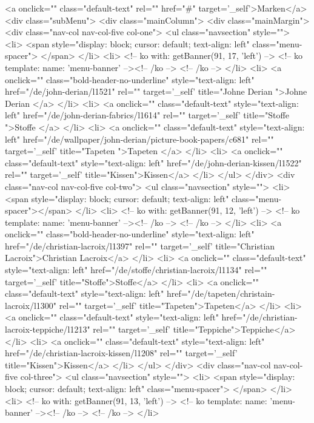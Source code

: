 <a onclick="" class="default-text" rel="" href="#" target='_self'>Marken</a>
<div class="subMenu">
<div class="mainColumn">
<div class="mainMargin">
<div class="nav-col nav-col-five col-one">
<ul class="navsection" style="">
<li>
<span style="display: block; cursor: default; text-align: left" class="menu-spacer"> </span>
</li>
<li>
<!-- ko with: getBanner(91, 17, 'left') -->
<!-- ko template: { name: 'menu-banner' } --><!-- /ko -->
<!-- /ko -->
</li>
<li>
<a onclick="" class="bold-header-no-underline" style="text-align: left" href="/de/john-derian/l1521" rel="" target='_self' title="Johne Derian ">Johne Derian </a>
</li>
<li>
<a onclick="" class="default-text" style="text-align: left" href="/de/john-derian-fabrics/l1614" rel="" target='_self' title="Stoffe	">Stoffe	</a>
</li>
<li>
<a onclick="" class="default-text" style="text-align: left" href="/de/wallpaper/john-derian/picture-book-papers/c681" rel="" target='_self' title="Tapeten	">Tapeten	</a>
</li>
<li>
<a onclick="" class="default-text" style="text-align: left" href="/de/john-derian-kissen/l1522" rel="" target='_self' title="Kissen">Kissen</a>
</li>
</ul>
</div>
<div class="nav-col nav-col-five col-two">
<ul class="navsection" style="">
<li>
<span style="display: block; cursor: default; text-align: left" class="menu-spacer"></span>
</li>
<li>
<!-- ko with: getBanner(91, 12, 'left') -->
<!-- ko template: { name: 'menu-banner' } --><!-- /ko -->
<!-- /ko -->
</li>
<li>
<a onclick="" class="bold-header-no-underline" style="text-align: left" href="/de/christian-lacroix/l1397" rel="" target='_self' title="Christian Lacroix">Christian Lacroix</a>
</li>
<li>
<a onclick="" class="default-text" style="text-align: left" href="/de/stoffe/christian-lacroix/l1134" rel="" target='_self' title="Stoffe">Stoffe</a>
</li>
<li>
<a onclick="" class="default-text" style="text-align: left" href="/de/tapeten/christain-lacroix/l1300" rel="" target='_self' title="Tapeten">Tapeten</a>
</li>
<li>
<a onclick="" class="default-text" style="text-align: left" href="/de/christian-lacroix-teppiche/l1213" rel="" target='_self' title="Teppiche">Teppiche</a>
</li>
<li>
<a onclick="" class="default-text" style="text-align: left" href="/de/christian-lacroix-kissen/l1208" rel="" target='_self' title="Kissen">Kissen</a>
</li>
</ul>
</div>
<div class="nav-col nav-col-five col-three">
<ul class="navsection" style="">
<li>
<span style="display: block; cursor: default; text-align: left" class="menu-spacer"> </span>
</li>
<li>
<!-- ko with: getBanner(91, 13, 'left') -->
<!-- ko template: { name: 'menu-banner' } --><!-- /ko -->
<!-- /ko -->
</li>
